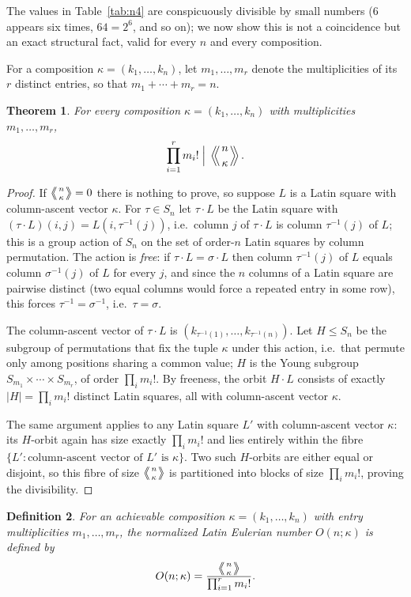 \documentclass[11pt]{amsart}
\newtheorem{theorem}{Theorem}[section]
\newtheorem{definition}[theorem]{Definition}
\newcommand{\LE}[1]{\left\langle\!\!\left\langle #1 \right\rangle\!\!\right\rangle}
\begin{document}
The values in Table~\ref{tab:n4} are conspicuously divisible by small numbers ($6$ appears six times, $64=2^6$, and so on); we now show this is not a coincidence but an exact structural fact, valid for every $n$ and every composition.

For a composition $\kappa = (k_1, \dots, k_n)$, let $m_1, \dots, m_r$ denote the multiplicities of its $r$ distinct entries, so that $m_1 + \cdots + m_r = n$.
\begin{theorem}\label{thm:divisibility}
For every composition $\kappa=(k_1,\dots,k_n)$ with multiplicities $m_1,\dots,m_r$,
\[
\prod_{i=1}^r m_i! \;\Big|\; \LE{n\atop\kappa}.
\]
\end{theorem}
\begin{proof}
If $\LE{n\atop\kappa}=0$ there is nothing to prove, so suppose $L$ is a Latin square with column-ascent vector $\kappa$. For $\tau\in S_n$ let $\tau\cdot L$ be the Latin square with $(\tau\cdot L)(i,j)=L(i,\tau^{-1}(j))$, i.e.\ column $j$ of $\tau\cdot L$ is column $\tau^{-1}(j)$ of $L$; this is a group action of $S_n$ on the set of order-$n$ Latin squares by column permutation. The action is \emph{free}: if $\tau\cdot L=\sigma\cdot L$ then column $\tau^{-1}(j)$ of $L$ equals column $\sigma^{-1}(j)$ of $L$ for every $j$, and since the $n$ columns of a Latin square are pairwise distinct (two equal columns would force a repeated entry in some row), this forces $\tau^{-1}=\sigma^{-1}$, i.e.\ $\tau=\sigma$.

The column-ascent vector of $\tau\cdot L$ is $(k_{\tau^{-1}(1)},\dots,k_{\tau^{-1}(n)})$. Let $H\le S_n$ be the subgroup of permutations that fix the tuple $\kappa$ under this action, i.e.\ that permute only among positions sharing a common value; $H$ is the Young subgroup $S_{m_1}\times\cdots\times S_{m_r}$, of order $\prod_i m_i!$. By freeness, the orbit $H\cdot L$ consists of exactly $|H|=\prod_i m_i!$ distinct Latin squares, all with column-ascent vector $\kappa$.

The same argument applies to any Latin square $L'$ with column-ascent vector $\kappa$: its $H$-orbit again has size exactly $\prod_i m_i!$ and lies entirely within the fibre $\{L': \text{column-ascent vector of }L' \text{ is } \kappa\}$. Two such $H$-orbits are either equal or disjoint, so this fibre of size $\LE{n\atop\kappa}$ is partitioned into blocks of size $\prod_i m_i!$, proving the divisibility.
\end{proof}
\begin{definition}\label{def:normalized}
For an achievable composition $\kappa = (k_1, \dots, k_n)$ with entry multiplicities $m_1, \dots, m_r$, the normalized Latin Eulerian number $O(n;\kappa)$ is defined by
\[
O(n;\kappa) = \frac{\LE{n\atop\kappa}}{\prod_{i=1}^r m_i!}.
\]
\end{definition}
\end{document}

